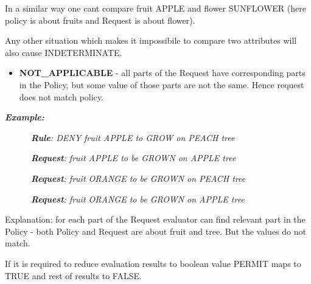 \documentclass{article}
\newcommand\liststyleWWviiiNumxxi{%
\renewcommand\labelitemi{[F0B7?]}
\renewcommand\labelitemii{o}
\renewcommand\labelitemiii{[F0A7?]}
\renewcommand\labelitemiv{[F0B7?]}
}
\begin{document}
{\color{black}
In a similar way one can{\textquotesingle}t compare {\textquotedbl}fruit
APPLE{\textquotedbl} and {\textquotedbl}flower SUNFLOWER{\textquotedbl}
(here policy is about fruits and Request is about flower).}

{\color{black}
Any other situation which makes it impossibile to compare two attributes
will also cause {\textquotedbl}INDETERMINATE{\textquotedbl}.}


\bigskip

\liststyleWWviiiNumxxi
\begin{itemize}
\item {\color{black}
\foreignlanguage{english}{\textbf{NOT\_APPLICABLE}}\foreignlanguage{english}{
- all parts of the Request have corresponding parts in the Policy, but
some value of those parts are not the same. Hence request does not
match policy.}}
\end{itemize}
{\bfseries\itshape\color{black}
Example:}

{\upshape\color{black}
\foreignlanguage{english}{\textit{\ \ \ \ \ \ }}\foreignlanguage{english}{\textbf{\textit{Rule}}}\foreignlanguage{english}{\textit{:
DENY fruit APPLE to GROW on PEACH tree}}}

{\upshape\color{black}
\foreignlanguage{english}{\textit{\ \ \ \ \ \ }}\foreignlanguage{english}{\textbf{\textit{Request}}}\foreignlanguage{english}{\textit{:
fruit APPLE to be GROWN on APPLE tree }}}

{\upshape\color{black}
\foreignlanguage{english}{\textit{\ \ \ \ \ \ }}\foreignlanguage{english}{\textbf{\textit{Request}}}\foreignlanguage{english}{\textit{:
fruit ORANGE to be GROWN on PEACH tree }}}

{\upshape\color{black}
\foreignlanguage{english}{\textit{\ \ \ \ \ \ }}\foreignlanguage{english}{\textbf{\textit{Request}}}\foreignlanguage{english}{\textit{:
fruit ORANGE to be GROWN on APPLE tree }}}

{\color{black}
Explanation: for each part of the Request evaluator can find relevant
part in the Policy - both Policy and Request are about fruit and tree.
But the values do not match.}

{\color{black}
If it is required to reduce evaluation results to boolean value PERMIT
maps to TRUE and rest of results to FALSE.}
\end{document}
